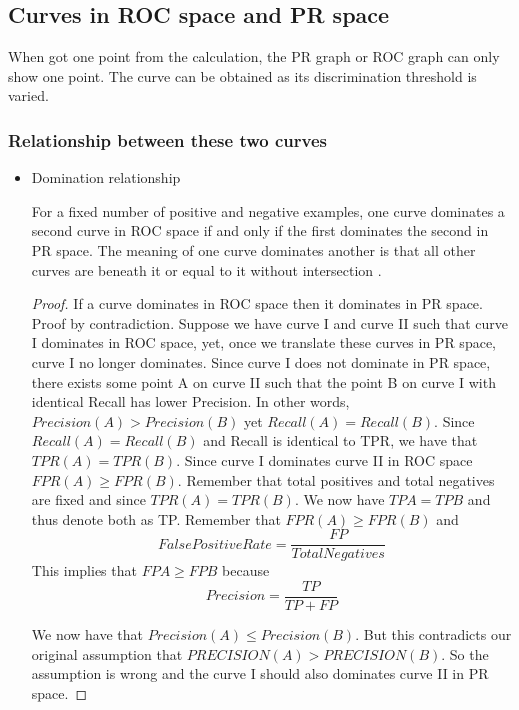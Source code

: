 \documentclass[a4paper,12pt]{article}
\begin{document}
\subsection{Curves in ROC space and PR space}
When got one point from the calculation, the PR graph or ROC graph can only show one point. The curve can be obtained as its discrimination threshold is varied.
\subsubsection{Relationship between these two curves}
\begin{itemize}
\item Domination relationship 

For a fixed number of positive and negative examples, one curve dominates a second curve in ROC space if and only if the first dominates the second
in PR space. The meaning of one curve dominates another is that all other curves are beneath it or equal to it without intersection \cite{3:article}.

\begin{proof} If a curve dominates in ROC space then it dominates in PR space. Proof by contradiction. Suppose we have curve I and curve II such that curve I dominates in ROC space, yet, once we translate these curves in PR space, curve I no longer dominates. Since curve I does not dominate in PR space, there exists some point A on curve II such that the point B on curve I with identical Recall has lower Precision. In other words, $Precision(A)>Precision(B)$ yet $Recall(A) = Recall(B)$. Since $Recall(A) = Recall(B)$ and Recall is identical to TPR, we have that $TPR(A) = TPR(B)$. Since curve I dominates curve II in ROC space $FPR(A) ≥ FPR(B)$. Remember that total positives and total negatives are fixed and since $TPR(A) = TPR(B)$. We now have $TPA = TPB$ and thus denote both as TP. Remember that $FPR(A)\ge FPR(B)$ and  
\begin{equation}\label{eq:FPR}
FalsePositiveRate=\frac{FP}{Total Negatives}
\end{equation}    
 This implies that $FPA \ge FPB$ because
\begin{equation}\label{eq:P}
Precision=\frac{TP}{TP+FP}
\end{equation}

We now have that $Precision (A)\le Precision (B)$. But this contradicts our original assumption that $PRECISION (A) >PRECISION (B)$. So the assumption is wrong and the curve I should also dominates curve II in PR space.


\end{proof}
\end{itemize}
\end{document}
